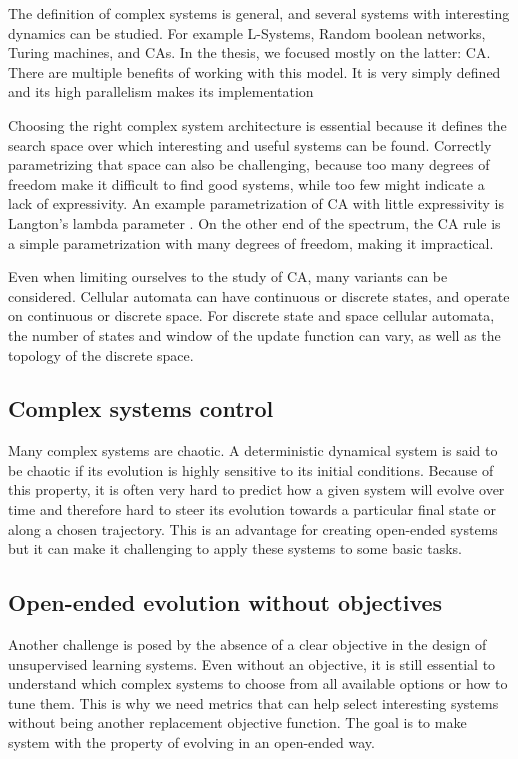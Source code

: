 The definition of complex systems is general, and several systems with
interesting dynamics can be studied. For example L-Systems, Random boolean
networks, Turing machines, and \Acfp{CA}. In the thesis, we focused mostly on
the latter: \ac{CA}. There are multiple benefits of working with this model. It
is very simply defined and its high parallelism makes its implementation

Choosing the right complex system architecture is essential because it defines
the search space over which interesting and useful systems can be found.
Correctly parametrizing that space can also be challenging, because too many
degrees of freedom make it difficult to find good systems, while too few might
indicate a lack of expressivity. An example parametrization of \ac{CA} with
little expressivity is Langton's lambda parameter
\parencite{langton_computation_1990}. On the other end of the spectrum, the
\ac{CA} rule is a simple parametrization with many degrees of freedom, making it
impractical.

Even when limiting ourselves to the study of \ac{CA}, many variants
can be considered. Cellular automata can have continuous or discrete states, and
operate on continuous or discrete space. For discrete state and space cellular
automata, the number of states and window of the update function can vary, as
well as the topology of the discrete space.


\subsection{Complex systems control}\label{sec:compl-syst-contr}

Many complex systems are chaotic. A deterministic dynamical system is said to be
chaotic if its evolution is highly sensitive to its initial conditions. Because
of this property, it is often very hard to predict how a given system will
evolve over time and therefore hard to steer its evolution towards a particular
final state or along a chosen trajectory. This is an advantage for creating
open-ended systems but it can make it challenging to apply these systems to some
basic tasks.

\subsection{Open-ended evolution without
  objectives}\label{sec:open-ended-evolution}

Another challenge is posed by the absence of a clear objective in the design of
unsupervised learning systems. Even without an objective, it is still essential
to understand which complex systems to choose from all available options or how
to tune them. This is why we need metrics that can help select interesting
systems without being another replacement objective function. The goal is to
make system with the property of evolving in an open-ended way.

